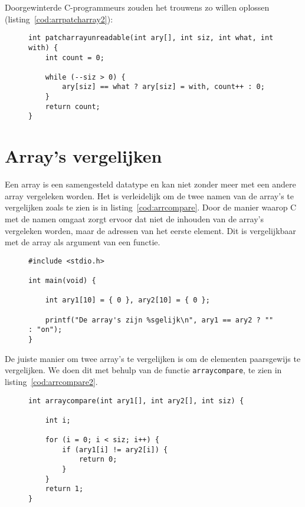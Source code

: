 Doorgewinterde C-programmeurs zouden het trouwens zo willen oplossen (listing~\ref{cod:arrpatcharray2}):

\begin{figure}[!ht]
\begin{lstlisting}[caption=Functie om een getal te vervangen door een ander getal.,label=cod:arrpatcharray2]
int patcharrayunreadable(int ary[], int siz, int what, int with) {
    int count = 0;

    while (--siz > 0) {
        ary[siz] == what ? ary[siz] = with, count++ : 0;
    }
    return count;
}
\end{lstlisting}
\end{figure}


\section{Array's vergelijken}
Een array is een samengesteld datatype en kan niet zonder meer met een andere array vergeleken worden. Het is verleidelijk om de twee namen van de array's te vergelijken zoals te zien is in listing~\ref{cod:arrcompare}. Door de manier waarop C met de namen omgaat zorgt ervoor dat niet de inhouden van de array's vergeleken worden, maar de adressen van het eerste element. Dit is vergelijkbaar met de array als argument van een functie.

\begin{figure}[!ht]
\begin{lstlisting}[caption=Vergelijken van twee array's (foutief).,label=cod:arrcompare]
#include <stdio.h>

int main(void) {

	int ary1[10] = { 0 }, ary2[10] = { 0 };

	printf("De array's zijn %sgelijk\n", ary1 == ary2 ? "" : "on");
}
\end{lstlisting}
\end{figure}

De juiste manier om twee array's te vergelijken is om de elementen paarsgewijs te vergelijken. We doen dit met behulp van de functie \texttt{arraycompare}, te zien in listing~\ref{cod:arrcompare2}.

\begin{figure}[H]
\begin{lstlisting}[caption=Vergelijken van twee array's.,label=cod:arrcompare2]
int arraycompare(int ary1[], int ary2[], int siz) {

	int i;

	for (i = 0; i < siz; i++) {
		if (ary1[i] != ary2[i]) {
			return 0;
		}
	}
	return 1;
}
\end{lstlisting}
\end{figure}

